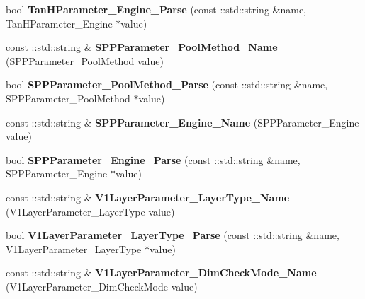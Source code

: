 \begin{DoxyCompactItemize}
\item 
\mbox{\label{namespacecaffe_a3f4d5665e87beb8aedcd9421f69280b3}} 
bool {\bfseries Tan\+H\+Parameter\+\_\+\+Engine\+\_\+\+Parse} (const \+::std\+::string \&name, Tan\+H\+Parameter\+\_\+\+Engine $\ast$value)
\item 
\mbox{\label{namespacecaffe_af6e70679740fcad8109e4a8111974050}} 
const \+::std\+::string \& {\bfseries S\+P\+P\+Parameter\+\_\+\+Pool\+Method\+\_\+\+Name} (S\+P\+P\+Parameter\+\_\+\+Pool\+Method value)
\item 
\mbox{\label{namespacecaffe_ac83733625b257484b0b94caacf5c422c}} 
bool {\bfseries S\+P\+P\+Parameter\+\_\+\+Pool\+Method\+\_\+\+Parse} (const \+::std\+::string \&name, S\+P\+P\+Parameter\+\_\+\+Pool\+Method $\ast$value)
\item 
\mbox{\label{namespacecaffe_a724602b7fcb87a0be33cca178f7b8923}} 
const \+::std\+::string \& {\bfseries S\+P\+P\+Parameter\+\_\+\+Engine\+\_\+\+Name} (S\+P\+P\+Parameter\+\_\+\+Engine value)
\item 
\mbox{\label{namespacecaffe_ac5cf6ba630f7b23da9b622ea518e529d}} 
bool {\bfseries S\+P\+P\+Parameter\+\_\+\+Engine\+\_\+\+Parse} (const \+::std\+::string \&name, S\+P\+P\+Parameter\+\_\+\+Engine $\ast$value)
\item 
\mbox{\label{namespacecaffe_a91145ce231bd8b672916bd8a76ffa14b}} 
const \+::std\+::string \& {\bfseries V1\+Layer\+Parameter\+\_\+\+Layer\+Type\+\_\+\+Name} (V1\+Layer\+Parameter\+\_\+\+Layer\+Type value)
\item 
\mbox{\label{namespacecaffe_a5620a7f9059a9bf048a2184e2ea49328}} 
bool {\bfseries V1\+Layer\+Parameter\+\_\+\+Layer\+Type\+\_\+\+Parse} (const \+::std\+::string \&name, V1\+Layer\+Parameter\+\_\+\+Layer\+Type $\ast$value)
\item 
\mbox{\label{namespacecaffe_aa385d80fc5f521436e38ba0f6a7f0d3f}} 
const \+::std\+::string \& {\bfseries V1\+Layer\+Parameter\+\_\+\+Dim\+Check\+Mode\+\_\+\+Name} (V1\+Layer\+Parameter\+\_\+\+Dim\+Check\+Mode value)
\item 
\mbox{\label{namespacecaffe_a01c53229a967c0ccb4390ce73a5c0d49}} 

\end{DoxyCompactItemize}
